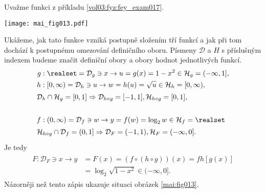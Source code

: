 \begin{mdframed}[style=mdexam]
  \begin{example}\label{mai:exam025}
    Uvažme funkci z příkladu \ref{vol03:fyz:fey_exam017}. 
    
    {\centering
    \captionsetup{type=figure}
    \texttt{[image: mai\_fig013.pdf]}
    \par}
    
    Ukážeme, jak tato funkce vzniká postupně složením tří funkcí a jak při tom dochází k postupnému 
    omezování definičního oboru. Písmeny \(\mathcal{D}\) a \(H\) s příslušným indexem budeme značit 
    definiční obory a obory hodnot jednotlivých funkcí.
    \begin{gather*}
      \begin{align*}
        g&:  \realset =\mathcal{D}_g\ni x\rightarrow u=g(x) = 1- x^2  \in\mathcal{H}_g=(-\infty,1], \\
        h&: [0,\infty)=\mathcal{D}_h\ni u\rightarrow w=h(u) = \sqrt{u}\in\mathcal{H}_h=[0,\infty),  \\
       \shortintertext{\(\mathcal{D}_h\cap\mathcal{H}_g = [0,1]\Rightarrow\mathcal{D}_{h\circ g}=[-1,1], 
                       \mathcal{H}_{h\circ g} = [0,1],\)}                                    \\
       f&:(0,\infty)=\mathcal{D}_f\ni w \rightarrow y=f(w)=\log_2w\in\mathcal{H}_f=\realset  \\
       \shortintertext{\(\mathcal{H}_{h\circ g}\cap\mathcal{D}_f = (0,1] 
                       \Rightarrow\mathcal{D}_F=(-1,1),\mathcal{H}_F=(-\infty,0].\)} 
      \end{align*}
    \end{gather*}
    Je tedy
    \begin{gather*}
      \begin{align*}
        F:\mathcal{D}_F\ni x\rightarrow 
        y&=F(x)=(f\circ(h\circ g))(x) = f{h[g(x)]}          \\
        &= \log_2\sqrt{1-x^2}\in(-\infty,0].
      \end{align*}
    \end{gather*}
    Názorněji než tento zápis ukazuje situaci obrázek \ref{mai:fig013}.
  \end{example}
\end{mdframed}